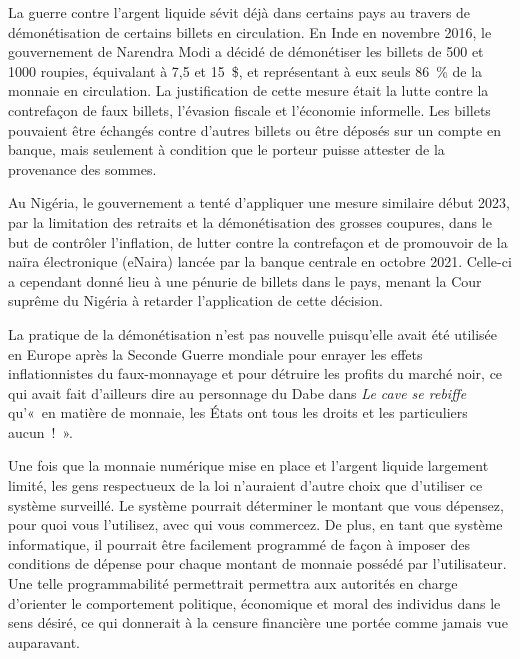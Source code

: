 La guerre contre l'argent liquide sévit déjà dans certains pays au travers de démonétisation de certains billets en circulation. En Inde en novembre 2016, le gouvernement de Narendra Modi a décidé de démonétiser les billets de 500 et 1000 roupies, équivalant à 7,5 et 15~\$, et représentant à eux seuls 86~\% de la monnaie en circulation. La justification de cette mesure était la lutte contre la contrefaçon de faux billets, l'évasion fiscale et l'économie informelle. Les billets pouvaient être échangés contre d'autres billets ou être déposés sur un compte en banque, mais seulement à condition que le porteur puisse attester de la provenance des sommes.

Au Nigéria, le gouvernement a tenté d'appliquer une mesure similaire début 2023, par la limitation des retraits et la démonétisation des grosses coupures, dans le but de contrôler l'inflation, de lutter contre la contrefaçon et de promouvoir de la naïra électronique (eNaira) lancée par la banque centrale en octobre 2021. Celle-ci a cependant donné lieu à une pénurie de billets dans le pays, menant la Cour suprême du Nigéria à retarder l'application de cette décision.

La pratique de la démonétisation n'est pas nouvelle puisqu'elle avait été utilisée en Europe après la Seconde Guerre mondiale pour enrayer les effets inflationnistes du faux-monnayage et pour détruire les profits du marché noir, ce qui avait fait d'ailleurs dire au personnage du Dabe dans \emph{Le cave se rebiffe} qu'«~en matière de monnaie, les États ont tous les droits et les particuliers aucun~!~».

Une fois que la monnaie numérique mise en place et l'argent liquide largement limité, les gens respectueux de la loi n'auraient d'autre choix que d'utiliser ce système surveillé. Le système pourrait déterminer le montant que vous dépensez, pour quoi vous l'utilisez, avec qui vous commercez. De plus, en tant que système informatique, il pourrait être facilement programmé de façon à imposer des conditions de dépense pour chaque montant de monnaie possédé par l'utilisateur. Une telle programmabilité permettrait permettra aux autorités en charge d'orienter le comportement politique, économique et moral des individus dans le sens désiré, ce qui donnerait à la censure financière une portée comme jamais vue auparavant.

